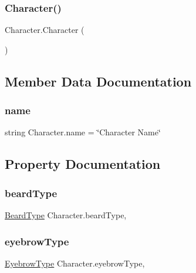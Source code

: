 \subsubsection{\texorpdfstring{Character()}{Character()}}
{\footnotesize\ttfamily Character.\+Character (\begin{DoxyParamCaption}{ }\end{DoxyParamCaption})}



\subsection{Member Data Documentation}
\mbox{\label{class_character_adbfa3b858f99f337203a1bec67b2fe45}} 
\subsubsection{\texorpdfstring{name}{name}}
{\footnotesize\ttfamily string Character.\+name = \char`\"{}Character Name\char`\"{}}



\subsection{Property Documentation}
\mbox{\label{class_character_a77735a4eeb0530c85de8e53145cb6044}} 
\subsubsection{\texorpdfstring{beardType}{beardType}}
{\footnotesize\ttfamily \mbox{\hyperlink{class_character_afc1fe7f790870a92fe62d3e57296de81}{Beard\+Type}} Character.\+beard\+Type\hspace{0.3cm}{\ttfamily [get]}, {\ttfamily [set]}}

\mbox{\label{class_character_a470cb22e12212f2cb43f77b1c06445d3}} 
\subsubsection{\texorpdfstring{eyebrowType}{eyebrowType}}
{\footnotesize\ttfamily \mbox{\hyperlink{class_character_a7ba51a2ab6ee02a615df9275665c5e4c}{Eyebrow\+Type}} Character.\+eyebrow\+Type\hspace{0.3cm}{\ttfamily [get]}, {\ttfamily [set]}}

